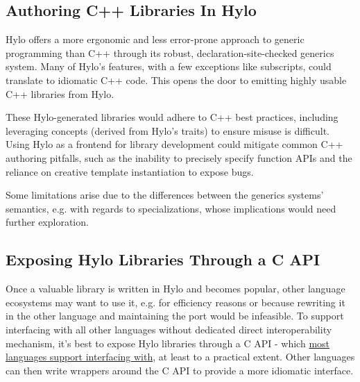 \subsection{Authoring C++ Libraries In Hylo}
Hylo offers a more ergonomic and less error-prone approach to generic programming than C++ through its robust, declaration-site-checked generics system. Many of Hylo's features, with a few exceptions like subscripts, could translate to idiomatic C++ code. This opens the door to emitting highly usable C++ libraries from Hylo.

These Hylo-generated libraries would adhere to C++ best practices, including leveraging concepts (derived from Hylo's traits) to ensure misuse is difficult. Using Hylo as a frontend for library development could mitigate common C++ authoring pitfalls, such as the inability to precisely specify function APIs and the reliance on creative template instantiation to expose bugs.

Some limitations arise due to the differences between the generics systems' semantics, e.g. with regards to specializations, whose implications would need further exploration.

\subsection{Exposing Hylo Libraries Through a C API}

Once a valuable library is written in Hylo and becomes popular, other language ecosystems may want to use it, e.g. for efficiency reasons or because rewriting it in the other language and maintaining the port would be infeasible. To support interfacing with all other languages without dedicated direct interoperability mechanism, it's best to expose Hylo libraries through a C API - which \href{https://arxiv.org/abs/2411.08388}{most languages support interfacing with}, at least to a practical extent. Other languages can then write wrappers around the C API to provide a more idiomatic interface.


